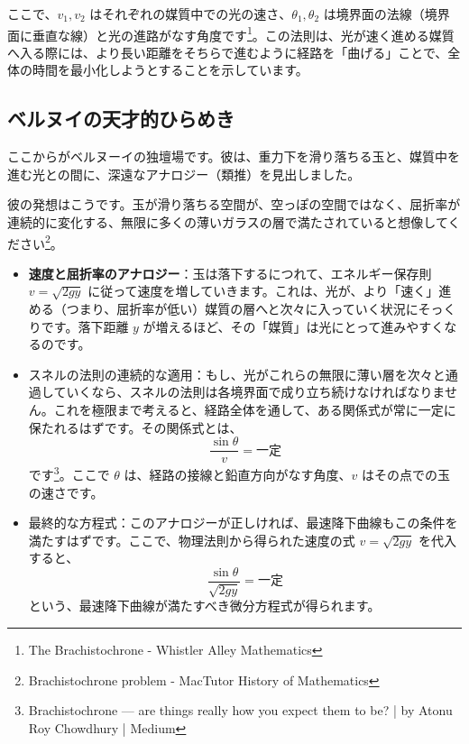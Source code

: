 \documentclass[a4paper,12pt]{bxjsarticle}
\begin{document}
ここで、$v_1, v_2$ はそれぞれの媒質中での光の速さ、$\theta_1, \theta_2$ は境界面の法線（境界面に垂直な線）と光の進路がなす角度です\footnote{The Brachistochrone - Whistler Alley Mathematics}。この法則は、光が速く進める媒質へ入る際には、より長い距離をそちらで進むように経路を「曲げる」ことで、全体の時間を最小化しようとすることを示しています。

\subsection{ベルヌイの天才的ひらめき}

ここからがベルヌーイの独壇場です。彼は、重力下を滑り落ちる玉と、媒質中を進む光との間に、深遠なアナロジー（類推）を見出しました。

彼の発想はこうです。玉が滑り落ちる空間が、空っぽの空間ではなく、屈折率が連続的に変化する、無限に多くの薄いガラスの層で満たされていると想像してください\footnote{Brachistochrone problem - MacTutor History of Mathematics}。

\begin{itemize}
\item \textbf{速度と屈折率のアナロジー}：玉は落下するにつれて、エネルギー保存則 $v=\sqrt{2gy}$ に従って速度を増していきます。これは、光が、より「速く」進める（つまり、屈折率が低い）媒質の層へと次々に入っていく状況にそっくりです。落下距離 $y$ が増えるほど、その「媒質」は光にとって進みやすくなるのです。

\item スネルの法則の連続的な適用：もし、光がこれらの無限に薄い層を次々と通過していくなら、スネルの法則は各境界面で成り立ち続けなければなりません。これを極限まで考えると、経路全体を通して、ある関係式が常に一定に保たれるはずです。その関係式とは、
\begin{equation}
\frac{\sin\theta}{v}=\text{一定}
\end{equation}
です\footnote{Brachistochrone — are things really how you expect them to be? | by Atonu Roy Chowdhury | Medium}。ここで $\theta$ は、経路の接線と鉛直方向がなす角度、$v$ はその点での玉の速さです。

\item 最終的な方程式：このアナロジーが正しければ、最速降下曲線もこの条件を満たすはずです。ここで、物理法則から得られた速度の式 $v=\sqrt{2gy}$ を代入すると、
\begin{equation}
\frac{\sin\theta}{\sqrt{2gy}}=\text{一定}
\end{equation}
という、最速降下曲線が満たすべき微分方程式が得られます。
\end{itemize}
\end{document}
